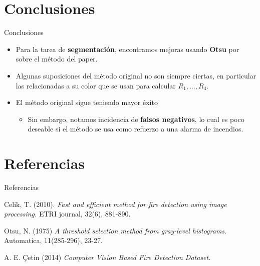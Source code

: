 \documentclass{beamer}
\begin{document}
 \section{Conclusiones}
 \begin{frame}{Conclusiones}
    \begin{itemize}
        \item Para la tarea de \textbf{segmentación}, encontramos mejoras usando \textbf{Otsu} por sobre el método del paper. 
        \item Algunas suposiciones del método original no son siempre ciertas, en particular las relacionadas a su color que se usan para calcular $R_1,\dots,R_4$.
        \item El método original sigue teniendo mayor éxito
        \begin{itemize}
            \item  Sin embargo, notamos incidencia de \textbf{falsos negativos}, lo cual es poco deseable si el método se usa como refuerzo a una alarma de incendios.
        \end{itemize}
        
    \end{itemize}
 \end{frame}


\section{Referencias}
\begin{frame}{Referencias}

\begin{thebibliography}{9}
Celik, T. (2010).
\textit{Fast and efficient method for fire detection using image processing.} ETRI journal, 32(6), 881-890.

Otsu, N. (1975)
\textit{A threshold selection method from gray-level histograms}. Automatica, 11(285-296), 23-27. 

A. E. Çetin (2014) 
\textit{Computer Vision Based Fire Detection Dataset.}

\end{thebibliography}
\end{frame}
\end{document}
